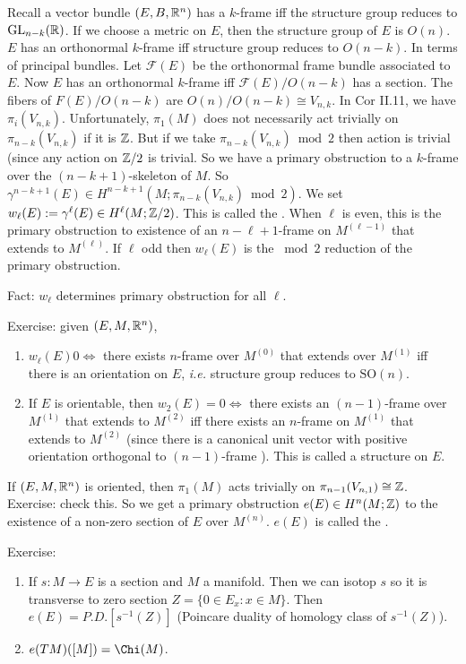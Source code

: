 \documentclass[12pt,class=article,crop=false]{standalone}
\begin{document}
\begin{eg}
Recall a vector bundle $ (E,B,\mathbb{R}^{n})$ has a $ k$-frame iff the structure group reduces to $ \text{GL}_{ n-k}(\mathbb{R}) $. If we choose a metric on $ E$, then the structure group of  $ E$ is  $ O(n)$.  $ E$ has an orthonormal  $ k$-frame iff structure group reduces to  $ O( n-k) $. In terms of principal bundles. Let $ \mathcal{ F}(E)$ be the orthonormal frame bundle associated to $ E$. Now  $ E$ has an orthonormal  $ k$-frame iff  $ \mathcal{ F}(E) / O(n-k)$ has a section. The fibers of $ F(E) / O(n-k)$ are  $ O(n) /O(n-k) \cong V_{n,k}$. In Cor II.11, we have $ \pi_i(V_{n,k})$. Unfortunately, $ \pi_1(M)$ does not necessarily act trivially on $ \pi_{n-k}(V_{n,k})$ if it is $ \mathbb{Z}$. But if we take $ \pi_{n-k}(V_{n,k}) \bmod 2$ then action is trivial (since any action on $ \mathbb{Z} /2$ is trivial. So we have a primary obstruction to a $ k$-frame over the  $ (n-k+1)$-skeleton of  $ M$. So  $ \gamma^{n-k+1}(E) \in H^{n-k+1}(M; \pi_{n-k}(V_{n,k}) \bmod 2)$. We set $ w_{\ell}(E) := \gamma^{\ell}(E) \in H^{\ell}(M; \mathbb{Z} /2)$. This is called the  . When $ \ell$ is even, this is the primary obstruction to existence of an $ n-\ell+1$-frame on $ M^{(\ell-1)}$ that extends to $ M^{(\ell)}$. If $ \ell$ odd then $ w_{\ell}(E)$ is the $ \bmod 2$ reduction of the primary obstruction.

Fact: $ w_\ell$ determines primary obstruction for all $ \ell$.

Exercise: given $ (E,M,\mathbb{R}^{n})$,
\begin{enumerate}[label=(\arabic*)]
	\item $ w_\ell(E) 0 \iff$ there exists $ n$-frame over  $ M^{(0)}$ that extends over $ M^{(1)}$ iff there is an orientation on $ E$, \emph{i.e.} structure group reduces to $ \text{SO}( n) $. 
	\item If $ E$ is orientable, then  $ w_2(E) = 0 \iff$ there exists an $ (n-1)$-frame over  $ M^{(1)}$ that extends to $ M^{(2)}$ iff there exists an $ n$-frame on  $ M^{(1)}$ that extends to $ M^{(2)}$ (since there is a canonical unit vector with positive orientation orthogonal to $ (n-1)$-frame ). This is called a  structure on $ E$. 
\end{enumerate}

\end{eg}
\begin{eg}
If $ (E,M,\mathbb{R}^{n})$ is oriented, then $ \pi_1(M)$ acts trivially on $ \pi_{n-1}(V_{n,1}) \cong \mathbb{Z}$. Exercise: check this. So we get a primary obstruction $ e(E) \in H^{n}(M;\mathbb{Z})$ to the existence of a non-zero section of $ E$ over  $ M^{(n)}$. $ e(E)$ is called the  . 

Exercise:
\begin{enumerate}[label=(\arabic*)]
	\item If $ s:M \to E$ is a section and $ M$ a manifold. Then we can isotop  $ s$ so it is transverse to zero section  $Z= \{0 \in E_x: x \in M\} $. Then $ e(E)= P.D.[s^{-1}(Z)]$ (Poincare duality of homology class of $ s ^{-1}(Z)$).
	\item $ e(TM) ([M]) = \Chi(M)$.
\end{enumerate}
\end{eg}
\end{document}
